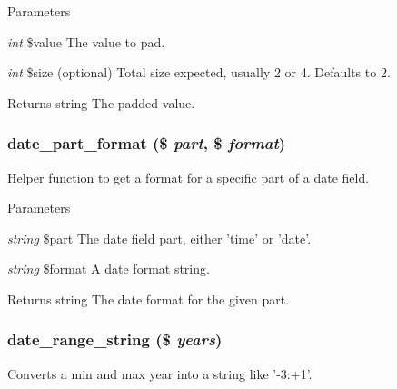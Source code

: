 \begin{DoxyParams}{Parameters}
\item[{\em int}]\$value The value to pad. \item[{\em int}]\$size (optional) Total size expected, usually 2 or 4. Defaults to 2.\end{DoxyParams}
\begin{DoxyReturn}{Returns}
string The padded value. 
\end{DoxyReturn}
\hypertarget{date__api_8module_abc007385b75d357bc72847b8aec3516e}{
\subsubsection[{date\_\-part\_\-format}]{\setlength{\rightskip}{0pt plus 5cm}date\_\-part\_\-format (\$ {\em part}, \/  \$ {\em format})}}
\label{date__api_8module_abc007385b75d357bc72847b8aec3516e}
Helper function to get a format for a specific part of a date field.


\begin{DoxyParams}{Parameters}
\item[{\em string}]\$part The date field part, either 'time' or 'date'. \item[{\em string}]\$format A date format string.\end{DoxyParams}
\begin{DoxyReturn}{Returns}
string The date format for the given part. 
\end{DoxyReturn}
\hypertarget{date__api_8module_abf93ddac7557727dde44e458d4471821}{
\subsubsection[{date\_\-range\_\-string}]{\setlength{\rightskip}{0pt plus 5cm}date\_\-range\_\-string (\$ {\em years})}}
\label{date__api_8module_abf93ddac7557727dde44e458d4471821}
Converts a min and max year into a string like '-\/3:+1'.


